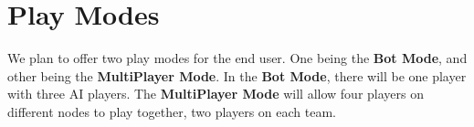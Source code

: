 \section{Play Modes}

We plan to offer two play modes for the end user. One being the \textbf{Bot Mode}, and other being the \textbf{MultiPlayer Mode}. In the \textbf{Bot Mode}, there will be one player with three AI players. The \textbf{MultiPlayer Mode} will allow four players on different nodes to play together, two players on each team.








